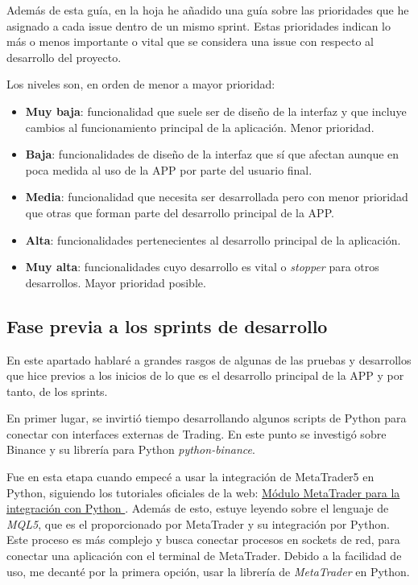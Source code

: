 Además de esta guía, en la hoja he añadido una guía sobre las prioridades que he asignado a cada issue dentro de un mismo sprint. Estas prioridades indican lo más o menos importante o vital que se considera una issue con respecto al desarrollo del proyecto. \newline

Los niveles son, en orden de menor a mayor prioridad: \newline
\begin{itemize}
	\item \textbf{Muy baja}: funcionalidad que suele ser de diseño de la interfaz y que incluye cambios al funcionamiento principal de la aplicación. Menor prioridad.
	\item \textbf{Baja}: funcionalidades de diseño de la interfaz que sí que afectan aunque en poca medida al uso de la APP por parte del usuario final.
	\item \textbf{Media}: funcionalidad que necesita ser desarrollada pero con menor prioridad que otras que forman parte del desarrollo principal de la APP.
	\item \textbf{Alta}: funcionalidades pertenecientes al desarrollo principal de la aplicación.
	\item \textbf{Muy alta}: funcionalidades cuyo desarrollo es vital o \textit{stopper} para otros desarrollos. Mayor prioridad posible.
\end{itemize}


\subsection{Fase previa a los sprints de desarrollo}

En este apartado hablaré a grandes rasgos de algunas de las pruebas y desarrollos que hice previos a los inicios de lo que es el desarrollo principal de la APP y por tanto, de los sprints. \newline

En primer lugar, se invirtió tiempo desarrollando algunos scripts de Python para conectar con interfaces externas de Trading. En este punto se investigó sobre Binance y su librería para Python \textit{python-binance}. \newline

Fue en esta etapa cuando empecé a usar la integración de MetaTrader5 en Python, siguiendo los tutoriales oficiales de la web: \href{https://www.mql5.com/es/docs/integration/python_metatrader5}{Módulo MetaTrader para la integración con Python
}. Además de esto, estuye leyendo sobre el lenguaje de \textit{MQL5}, que es el proporcionado por MetaTrader y su integración por Python. Este proceso es más complejo y busca conectar procesos en sockets de red, para conectar una aplicación con el terminal de MetaTrader. Debido a la facilidad de uso, me decanté por la primera opción, usar la librería de \textit{MetaTrader} en Python. \newline

